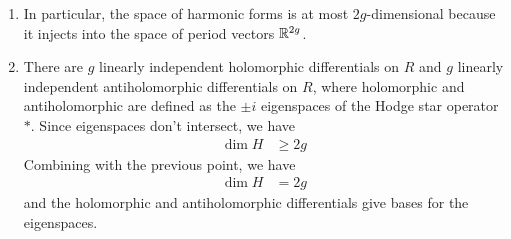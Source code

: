 \documentclass[12pt]{article}
\begin{document}
\begin{enumerate}
    \item In particular, the space of harmonic forms is at most $2g$-dimensional because it injects into the space of period vectors $\mathbb{R}^{2g}$.
    \item There are $g$ linearly independent holomorphic differentials on $R$ and $g$ linearly independent antiholomorphic differentials on $R$, where holomorphic and antiholomorphic are defined as the $\pm i$ eigenspaces of the Hodge star operator $*$. Since eigenspaces don't intersect, we have \begin{align*}
        \dim H & \geq 2g
    \end{align*} Combining with the previous point, we have \begin{align*}
        \dim H & = 2g
    \end{align*} and the holomorphic and antiholomorphic differentials give bases for the eigenspaces.
\end{enumerate}
\end{document}

